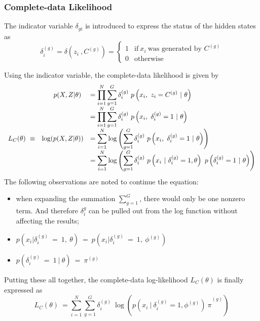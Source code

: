 \subsubsection{Complete-data Likelihood}
\label{sec:completedataLL}
The indicator variable \(\delta_{gi}\) is introduced to express the status of the hidden states as
\begin{equation*}
    \delta ^{( g)}_{i} =\delta \left( z_{i} \ ,C^{( g)}\right) =\begin{cases}
    1 & \text{if} \ x_{i} \ \text{was generated by } C^{( g)}\\
    0 & \text{otherwise}
    \end{cases}
\end{equation*}

Using the indicator variable, the complete-data likelihood is given by
\begin{equation*}
    \begin{array}{ r r l }
     & p( X,Z|\theta ) \  & {\displaystyle =\prod ^{N}_{i=1}\sum ^{G}_{g=1} \delta ^{( g)}_{i} \ p\left( x_{i} ,\ z_{i} =C^{( g)} \ |\ \theta \right)}\\
     &  & {\displaystyle =\prod ^{N}_{i=1}\sum ^{G}_{g=1} \delta ^{( g)}_{i} \ p\left( x_{i} ,\ \delta ^{( g)}_{i} =1\ |\ \theta \right)}\\
    L_{C}( \theta ) \ \equiv  & \log( p( X,Z|\theta )) & {\displaystyle =\sum ^{N}_{i=1}\log\left(\sum ^{G}_{g=1} \delta ^{( g)}_{i} \ p\left( x_{i} ,\ \delta ^{( g)}_{i} =1\ |\ \theta \right)\right)}\\
     &  & {\displaystyle =\sum ^{N}_{i=1}\log\left(\sum ^{G}_{g=1} \delta ^{( g)}_{i} \ p\left( x_{i} \ |\ \delta ^{( g)}_{i} =1,\theta \right) \ p\left( \delta ^{( g)}_{i} =1\ |\ \theta \right)\right)}
    \end{array}
\end{equation*}
The following observations are noted to continue the equation:
\begin{itemize}
    \item when expanding the summation \(\sum_{g=1}^{G}\), there would only be one nonzero term. And therefore \(\delta^{g}_i\) can be pulled out from the log function without affecting the results;
    \item $\displaystyle p\left( x_{i} |\delta ^{( g)}_{i} \ =\ 1,\ \theta \right) \ =\ p\left( x_{i} |\delta ^{( g)}_{i} \ =\ 1,\ \phi ^{( g)}\right)$
    \item $\displaystyle p\left( \delta ^{( g)}_{i} \ =\ 1\ |\ \theta \right) \ =\ \pi ^{( g)}$
\end{itemize}
Putting these all together, the complete-data log-likelihood $L_{C}( \theta )$ is finally expressed as
\begin{equation}
    L_{C}( \theta ) \ =\sum ^{N}_{i=1}\sum ^{G}_{g=1}{\displaystyle \delta ^{( g)}_{i} \ }\log\left({\displaystyle p\left( x_{i} \ |\ \delta ^{( g)}_{i} =1,\phi ^{( g)}\right) \ \pi }^{( g)}\right)
    \label{eq:completedataLL}
\end{equation}

